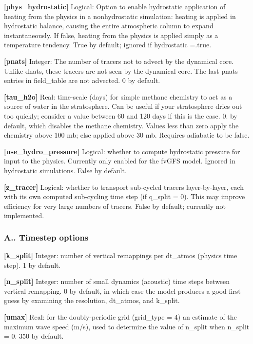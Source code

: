 {\bfseries \mbox{[}phys\+\_\+hydrostatic\mbox{]}} Logical\+: Option to enable hydrostatic application of heating from the physics in a nonhydrostatic simulation\+: heating is applied in hydrostatic balance, causing the entire atmospheric column to expand instantaneously. If false, heating from the physics is applied simply as a temperature tendency. True by default; ignored if hydrostatic =.true.

{\bfseries \mbox{[}pnats\mbox{]}} Integer\+: The number of tracers not to advect by the dynamical core. Unlike dnats, these tracers are not seen by the dynamical core. The last pnats entries in field\+\_\+table are not advected. 0 by default.

{\bfseries \mbox{[}tau\+\_\+h2o\mbox{]}} Real\+: time-\/scale (days) for simple methane chemistry to act as a source of water in the stratosphere. Can be useful if your stratosphere dries out too quickly; consider a value between 60 and 120 days if this is the case. 0. by default, which disables the methane chemistry. Values less than zero apply the chemistry above 100 mb; else applied above 30 mb. Requires adiabatic to be false.

{\bfseries \mbox{[}use\+\_\+hydro\+\_\+pressure\mbox{]}} Logical\+: whether to compute hydrostatic pressure for input to the physics. Currently only enabled for the fv\+G\+FS model. Ignored in hydrostatic simulations. False by default.

{\bfseries \mbox{[}z\+\_\+tracer\mbox{]}} Logical\+: whether to transport sub-\/cycled tracers layer-\/by-\/layer, each with its own computed sub-\/cycling time step (if q\+\_\+split = 0). This may improve efficiency for very large numbers of tracers. False by default; currently not implemented.

\subsubsection*{A.. Timestep options}

{\bfseries \mbox{[}k\+\_\+split\mbox{]}} Integer\+: number of vertical remappings per dt\+\_\+atmos (physics time step). 1 by default.

{\bfseries \mbox{[}n\+\_\+split\mbox{]}} Integer\+: number of small dynamics (acoustic) time steps between vertical remapping. 0 by default, in which case the model produces a good first guess by examining the resolution, dt\+\_\+atmos, and k\+\_\+split.

{\bfseries \mbox{[}umax\mbox{]}} Real\+: for the doubly-\/periodic grid (grid\+\_\+type = 4) an estimate of the maximum wave speed (m/s), used to determine the value of n\+\_\+split when n\+\_\+split = 0. 350 by default.

